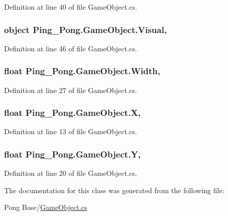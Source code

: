 Definition at line 40 of file Game\-Object.\-cs.

\hypertarget{class_ping___pong_1_1_game_object_ab7e73702e83fa5d455e191551fe86b22}{
\subsubsection[{Visual}]{\setlength{\rightskip}{0pt plus 5cm}object Ping\-\_\-\-Pong.\-Game\-Object.\-Visual\hspace{0.3cm}{\ttfamily [get]}, {\ttfamily [set]}}}\label{class_ping___pong_1_1_game_object_ab7e73702e83fa5d455e191551fe86b22}


Definition at line 46 of file Game\-Object.\-cs.

\hypertarget{class_ping___pong_1_1_game_object_a828f5327d84be8a61d48534b2dc39e92}{
\subsubsection[{Width}]{\setlength{\rightskip}{0pt plus 5cm}float Ping\-\_\-\-Pong.\-Game\-Object.\-Width\hspace{0.3cm}{\ttfamily [get]}, {\ttfamily [set]}}}\label{class_ping___pong_1_1_game_object_a828f5327d84be8a61d48534b2dc39e92}


Definition at line 27 of file Game\-Object.\-cs.

\hypertarget{class_ping___pong_1_1_game_object_ada20bb1f95db380d4c1af7c2030b0c1b}{
\subsubsection[{X}]{\setlength{\rightskip}{0pt plus 5cm}float Ping\-\_\-\-Pong.\-Game\-Object.\-X\hspace{0.3cm}{\ttfamily [get]}, {\ttfamily [set]}}}\label{class_ping___pong_1_1_game_object_ada20bb1f95db380d4c1af7c2030b0c1b}


Definition at line 13 of file Game\-Object.\-cs.

\hypertarget{class_ping___pong_1_1_game_object_adf561c4e05f7c2f4032d8302e01a3967}{
\subsubsection[{Y}]{\setlength{\rightskip}{0pt plus 5cm}float Ping\-\_\-\-Pong.\-Game\-Object.\-Y\hspace{0.3cm}{\ttfamily [get]}, {\ttfamily [set]}}}\label{class_ping___pong_1_1_game_object_adf561c4e05f7c2f4032d8302e01a3967}


Definition at line 20 of file Game\-Object.\-cs.



The documentation for this class was generated from the following file\-:\begin{DoxyCompactItemize}
\item 
Pong Base/\hyperlink{_game_object_8cs}{Game\-Object.\-cs}\end{DoxyCompactItemize}
